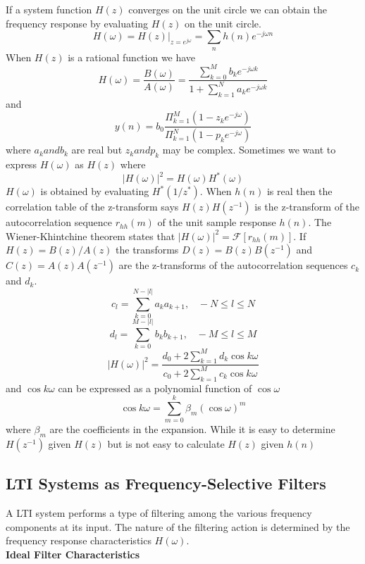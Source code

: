 \documentclass{article} %
\begin{document}
	If a system function $H(z)$ converges on the unit circle we can obtain the frequency response by evaluating $H(z)$ on the unit circle. 
	\begin{equation}
	H(\omega) = H(z)|_{z=e^{j\omega}} = \sum_n h(n)e^{-j\omega n}
	\end{equation}
	When $H(z)$ is a rational function we have
	\begin{equation}
	H(\omega) = \frac{B(\omega)}{A(\omega)} = \frac{\sum_{k=0}^M b_ke^{-j\omega k}}{1 + \sum_{k=1}^N a_k e^{-j\omega k}}
	\end{equation}
	and
	\begin{equation}
	y(n) = b_0 \frac{\Pi_{k=1}^M (1-z_ke^{-j\omega})}{\Pi_{k=1}^N (1-p_ke^{-j\omega})}
	\end{equation}
	where $a_k and b_k$ are real but $z_k and p_k$ may be complex. Sometimes we want to express $H(\omega)$ as $H(z)$ where 
	\begin{equation}
	|H(\omega)|^2 = H(\omega)H^*(\omega)
	\end{equation}
	$H(\omega)$ is obtained by evaluating $H^*(1/z^*)$. When $h(n)$ is real then the correlation table of the z-transform says $H(z)H(z^{-1})$ is the z-transform of the autocorrelation sequence $r_{hh}(m)$ of the unit sample response $h(n)$. The Wiener-Khintchine theorem states that $|H(\omega)|^2 = \mathcal{F}[r_{hh}(m)]$. If $H(z) = B(z)/A(z)$ the transforms $D(z)=B(z)B(z^{-1})$ and  $C(z)=A(z)A(z^{-1})$ are the z-transforms of the autocorrelation sequences $c_k$ and $d_k$. 
	\begin{equation}
	c_l = \sum_{k=0}^{N-|l|}a_ka_{k+1}, \;\;\; -N \le l \le N
	\end{equation}
	\begin{equation}
	d_l = \sum_{k=0}^{M-|l|}b_kb_{k+1}, \;\;\; -M \le l \le M
	\end{equation}
	\begin{equation}
	|H(\omega)|^2 = \frac{d_0 + 2\sum_{k=1}^M d_k \cos k\omega}{c_0 + 2\sum_{k=1}^M c_k \cos k\omega}
	\end{equation}
	and $\cos k\omega$ can be expressed as a polynomial function of $\cos \omega$
	\begin{equation}
	\cos k\omega = \sum_{m=0}^k \beta_m (\cos \omega)^m
	\end{equation}
	where $\beta_m$ are the coefficients in the expansion. While it is easy to determine $H(z^{-1})$ given $H(z)$ but is not easy to calculate $H(z)$ given $h(n)$
	
	\subsection{LTI Systems as Frequency-Selective Filters}
	A LTI system performs a type of filtering among the various frequency components at its input. The nature of the filtering action is determined by the frequency response characteristics $H(\omega)$. \\
	\textbf{Ideal Filter Characteristics}\\
	
\end{document}

